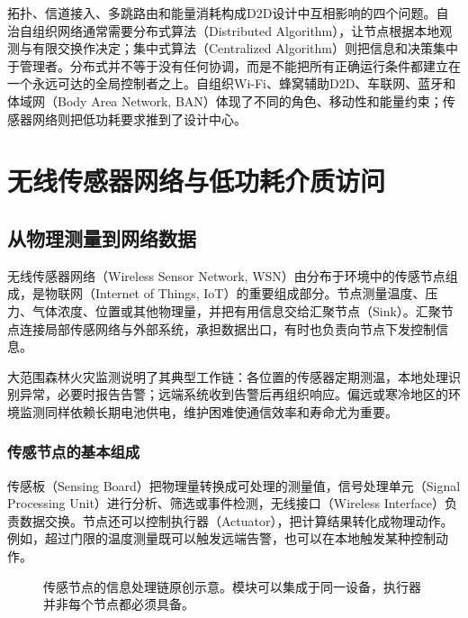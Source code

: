 拓扑、信道接入、多跳路由和能量消耗构成D2D设计中互相影响的四个问题。自治自组织网络通常需要分布式算法（Distributed Algorithm），让节点根据本地观测与有限交换作决定；集中式算法（Centralized Algorithm）则把信息和决策集中于管理者。分布式并不等于没有任何协调，而是不能把所有正确运行条件都建立在一个永远可达的全局控制者之上。自组织Wi-Fi、蜂窝辅助D2D、车联网、蓝牙和体域网（Body Area Network, BAN）体现了不同的角色、移动性和能量约束；传感器网络则把低功耗要求推到了设计中心。

\section{无线传感器网络与低功耗介质访问}
\label{ch:wsn}

\subsection{从物理测量到网络数据}

无线传感器网络（Wireless Sensor Network, WSN）由分布于环境中的传感节点组成，是物联网（Internet of Things, IoT）的重要组成部分。节点测量温度、压力、气体浓度、位置或其他物理量，并把有用信息交给汇聚节点（Sink）。汇聚节点连接局部传感网络与外部系统，承担数据出口，有时也负责向节点下发控制信息。

大范围森林火灾监测说明了其典型工作链：各位置的传感器定期测温，本地处理识别异常，必要时报告告警；远端系统收到告警后再组织响应。偏远或寒冷地区的环境监测同样依赖长期电池供电，维护困难使通信效率和寿命尤为重要。

\subsubsection{传感节点的基本组成}

传感板（Sensing Board）把物理量转换成可处理的测量值，信号处理单元（Signal Processing Unit）进行分析、筛选或事件检测，无线接口（Wireless Interface）负责数据交换。节点还可以控制执行器（Actuator），把计算结果转化成物理动作。例如，超过门限的温度测量既可以触发远端告警，也可以在本地触发某种控制动作。

\begin{figure}[htbp]
\centering
{}
\caption{传感节点的信息处理链原创示意。模块可以集成于同一设备，执行器并非每个节点都必须具备。}
\label{fig:p4-sensor}
\end{figure}

